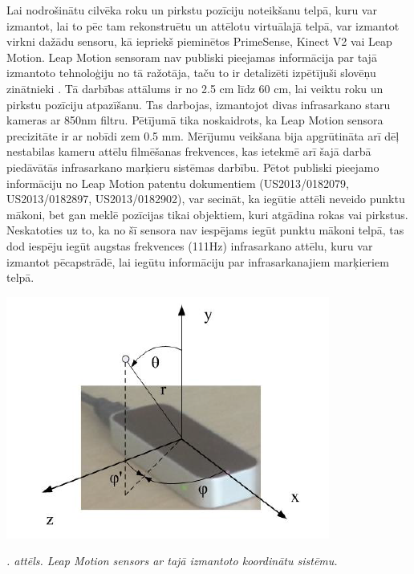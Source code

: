 \documentclass[12pt, a4paper, oneside, openright]{article}
\renewcommand{\thecimages}{\arabic{cimages}}
\begin{document}
\par
Lai nodrošinātu cilvēka roku un pirkstu pozīciju noteikšanu telpā, kuru var izmantot, lai to pēc tam 
rekonstruētu un attēlotu virtuālajā telpā, var izmantot virkni dažādu sensoru, kā iepriekš pieminētos PrimeSense, Kinect V2
vai Leap Motion. Leap Motion sensoram nav publiski pieejamas informācija par tajā izmantoto tehnoloģiju no tā ražotāja, taču
to ir detalizēti izpētījuši slovēņu zinātnieki \cite{JozeGuna2014}. Tā darbības attālums ir no 2.5 cm līdz 60 cm, lai
veiktu roku un pirkstu pozīciju atpazīšanu. Tas darbojas, izmantojot divas infrasarkano staru kameras ar 850nm filtru.
Pētījumā tika noskaidrots, ka Leap Motion sensora precizitāte ir ar nobīdi zem 0.5 mm. Mērījumu veikšana bija apgrūtināta
arī dēļ nestabilas kameru attēlu filmēšanas frekvences, kas ietekmē arī šajā darbā piedāvātās infrasarkano marķieru sistēmas
darbību. Pētot publiski pieejamo informāciju no Leap Motion patentu dokumentiem (US2013/0182079, US2013/0182897, US2013/0182902), 
var secināt, ka iegūtie attēli neveido punktu mākoni, bet gan meklē pozīcijas tikai objektiem, kuri atgādina rokas vai pirkstus.
Neskatoties uz to, ka no šī sensora nav iespējams iegūt punktu mākoni telpā, tas dod iespēju iegūt augstas frekvences (111Hz)
infrasarkano attēlu, kuru var izmantot pēcapstrādē, lai iegūtu informāciju par infrasarkanajiem marķieriem telpā.

\label{cimages:JozeGuna2014}
\vspace{10pt}
\begin{samepage}
\begin{center}
\includegraphics[width=0.5\columnwidth]{images/JozeGuna2014.png}
\begin{center}
\footnotesize{
\textit{\thecimages. attēls. Leap Motion sensors ar tajā izmantoto koordinātu sistēmu.}}
\end{center}
\end{center}
\end{samepage}
\end{document}
